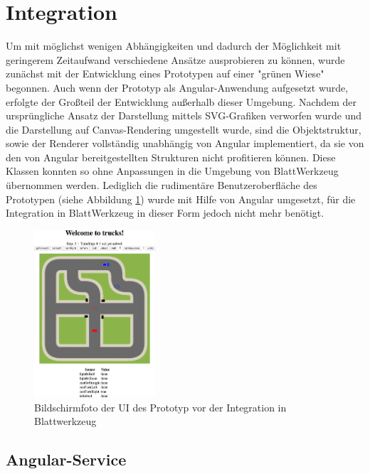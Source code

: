 \section{Integration}
\label{sec:implementation:integration}

Um mit möglichst wenigen Abhängigkeiten und dadurch der Möglichkeit mit geringerem Zeitaufwand verschiedene Ansätze ausprobieren zu können, wurde zunächst mit der Entwicklung eines Prototypen auf einer "grünen Wiese" begonnen. Auch wenn der Prototyp als Angular-Anwendung aufgesetzt wurde, erfolgte der Großteil der Entwicklung außerhalb dieser Umgebung. Nachdem der ursprüngliche Ansatz der Darstellung mittels SVG-Grafiken verworfen wurde und die Darstellung auf Canvas-Rendering umgestellt wurde, sind die Objektstruktur, sowie der Renderer vollständig unabhängig von Angular implementiert, da sie von den von Angular bereitgestellten Strukturen nicht profitieren können. Diese Klassen konnten so ohne Anpassungen in die Umgebung von BlattWerkzeug übernommen werden. Lediglich die rudimentäre Benutzeroberfläche des Prototypen (siehe Abbildung \ref{fig:implementation:integration:prototype}) wurde mit Hilfe von Angular umgesetzt, für die Integration in BlattWerkzeug in dieser Form jedoch nicht mehr benötigt.

\begin{figure}
  \centering
  \includegraphics[width=0.4\textwidth]{gfx/implementation-integration-prototype.png}
  \caption{Bildschirmfoto der UI des Prototyp vor der Integration in Blattwerkzeug}
  \label{fig:implementation:integration:prototype}
\end{figure}

\subsection{Angular-Service}
\label{sec:implementation:integration:ng-service}

